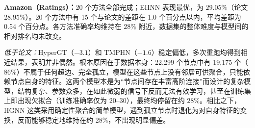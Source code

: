 \documentclass[11pt,a4paper]{article}
\begin{document}
\par\smallskip
\noindent\textbf{Amazon（Ratings）：}20 个方法全部完成；EHNN 表现最优，为 $29.05\%$（论文 $28.95\%$）。20 个方法中有 15 个与论文的差距在 1.0 个百分点以内，平均差距为 0.54 个百分点。各方法准确率均维持在 $28\%$ 附近，数据集的整体难度与模型间的相对排名均未改变。

\noindent\textit{低于论文：}HyperGT（$-3.1$）和 TMPHN（$-1.6$）稳定偏低，多次重跑均得到相近结果，表明并非偶然。根本原因在于数据本身：22{,}299 个节点中有 19{,}175 个（$86\%$）不属于任何超边、完全孤立，模型在这些节点上没有邻居可供聚合，只能依赖节点自身的特征。这两个模型本是为“节点间存在丰富高阶连接”而设计的复杂模型，结构复杂、参数众多，在如此微弱的信号下反而无法有效学习，甚至在训练集上即出现欠拟合（训练准确率仅为 $20$–$30$），最终均停留在约 $28\%$。相比之下，HGNN 这类采用确定性聚合的简单模型，遇到孤立节点时退化为对自身特征的变换，反而能够稳定地维持在约 $28\%$，不出现明显偏差。
\end{document}
